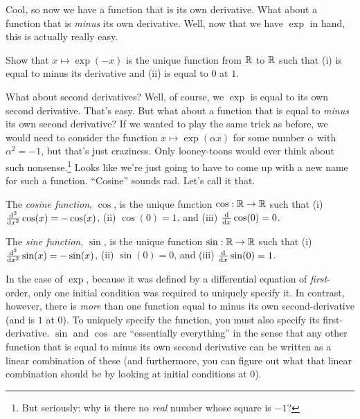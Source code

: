 Cool, so now we have a function that is its own derivative.  What about a function that is \emph{minus} its own derivative.  Well, now that we have $\exp$ in hand, this is actually really easy.
\begin{exr}
Show that $x\mapsto \exp (-x)$ is the unique function from $\mathbb{R}$ to $\mathbb{R}$ such that (i) is equal to minus its derivative and (ii) is equal to $0$ at $1$.
\end{exr}

What about second derivatives?  Well, of course, we $\exp$ is equal to its own second derivative.  That's easy.  But what about a function that is equal to \emph{minus} its own second derivative?  If we wanted to play the same trick as before, we would need to consider the function $x\mapsto \exp (\alpha x)$ for some number $\alpha$ with $\alpha ^2=-1$, but that's just craziness.  Only looney-toons would ever think about such nonsense.\footnote{But seriously:  why is there no \emph{real} number whose square is $-1$?}  Looks like we're just going to have to come up with a new name for such a function.  ``Cosine'' sounds rad.  Let's call it that.
\begin{dfn}
The \emph{cosine function}, $\cos$\index[notation]{$\cos$}, is the unique function $\cos :\mathbb{R} \rightarrow \mathbb{R}$ such that (i) $\frac{\mathop{}\!\mathrm{d} ^2}{\mathop{}\!\mathrm{d} x^2}\cos (x)=-\cos (x)$, (ii) $\cos (0)=1$, and (iii) $\frac{\mathop{}\!\mathrm{d}}{\mathop{}\!\mathrm{d} x}\cos (0)=0$.

The \emph{sine function}, $\sin$\index[notation]{$\sin$}, is the unique function $\sin :\mathbb{R} \rightarrow \mathbb{R}$ such that (i) $\frac{\mathop{}\!\mathrm{d} ^2}{\mathop{}\!\mathrm{d} x^2}\sin (x)=-\sin (x)$, (ii) $\sin (0)=0$, and (iii) $\frac{\mathop{}\!\mathrm{d}}{\mathop{}\!\mathrm{d} x}\sin (0)=1$.
\begin{rmk}
In the case of $\exp$, because it was defined by a differential equation of \emph{first}-order, only one initial condition was required to uniquely specify it.  In contrast, however, there is \emph{more} than one function equal to minus its own second-derivative (and is $1$ at $0$).  To uniquely specify the function, you must also specify its first-derivative.  $\sin$ and $\cos$ are ``essentially everything'' in the sense that any other function that is equal to minus its own second derivative can be written as a linear combination of these (and furthermore, you can figure out what that linear combination should be by looking at initial conditions at $0$).
\end{rmk}
\end{dfn}

